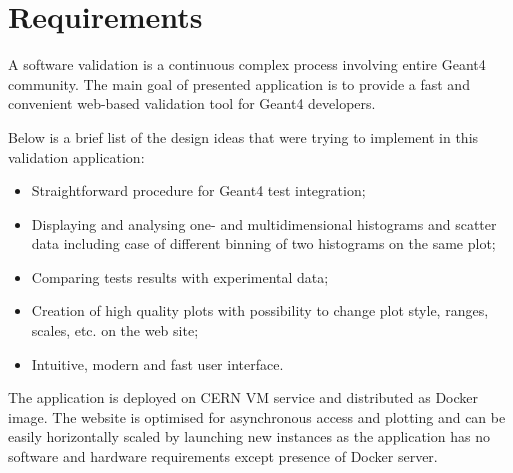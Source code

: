 \section{Requirements}
\label{sec:requirements}

A software validation is a continuous complex process involving entire Geant4 community. The main goal of presented application is to provide a fast and convenient web-based validation tool for Geant4 developers.

Below is a brief list of the design ideas that were trying to implement in this validation application:
\begin{itemize}
    \item Straightforward procedure for Geant4 test integration;
    \item Displaying and analysing one- and multidimensional histograms and scatter data including case of different binning of two histograms on the same plot;
    \item Comparing tests results with experimental data;
    \item Creation of high quality plots with possibility to change plot style, ranges, scales, etc. on the web site;
    \item Intuitive, modern and fast user interface.
\end{itemize}

The application is deployed on CERN VM service and distributed as Docker image. The website is optimised for asynchronous access and plotting and can be easily horizontally scaled by launching new instances as the application has no software and hardware requirements except presence of Docker server.

